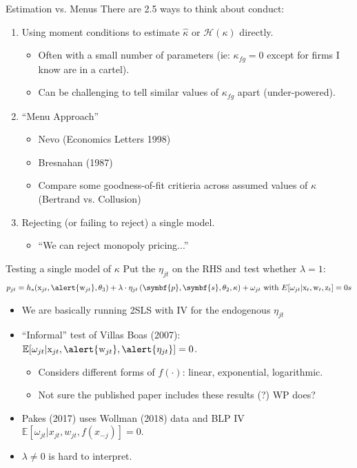 \documentclass[aspectratio=169,10pt]{beamer}
\begin{document}
\begin{frame}{Estimation vs. Menus}
There are 2.5 ways to think about conduct:
\begin{enumerate}
\item Using moment conditions to estimate $\widehat{\kappa}$ or $\mathcal{H}(\kappa)$ directly.
\begin{itemize}
\item Often with a small number of parameters (ie: $\kappa_{fg}=0$ except for firms I know are in a cartel).
\item Can be challenging to tell similar values of $\kappa_{fg}$ apart (under-powered).
\end{itemize}
\item ``Menu Approach''
\begin{itemize}
\item  Nevo (Economics Letters 1998)
\item Bresnahan (1987)
\item Compare some goodness-of-fit critieria across assumed values of $\kappa$ (Bertrand vs. Collusion)
  \end{itemize}
\item Rejecting (or failing to reject) a single model.
\begin{itemize}
  \item ``We can reject monopoly pricing...''
\end{itemize}
  \end{enumerate}
\end{frame}


\begin{frame}{Testing a single model of $\kappa$}
Put the $\eta_{jt}$ on the RHS and test whether $\lambda=1$:
\begin{align*}
 p_{jt} = h_s(\textrm{x}_{jt}, \alert{\textrm{w}_{jt}},\theta_3) + \lambda \cdot \eta_{jt}\left(\symbf{p},\symbf{s},\theta_2,\kappa \right)+  \omega_{jt} \text{ with }
 E[\omega_{jt} | \textrm{x}_{t},\textrm{w}_{t},\textrm{z}_{t}]=0s
\end{align*}
\vspace{-0.25cm}
\begin{itemize}
\item We are basically running 2SLS with IV for the endogenous $\eta_{jt}$
\item ``Informal'' test of Villas Boas (2007): $\mathbb{E}[\omega_{jt} | \textrm{x}_{jt},\alert{\textrm{w}_{jt}},\alert{\eta_{jt}}]=0$.
\begin{itemize}
\item Considers different forms of $f(\cdot)$: linear, exponential, logarithmic.
\item Not sure the published paper includes these results (?) WP does?
  \end{itemize}
\item Pakes (2017) uses Wollman (2018) data and BLP IV $\mathbb{E}[\omega_{jt} | x_{jt},w_{jt},f(x_{-j})]=0$.
\item $\lambda \neq 0$ is hard to interpret.
\end{itemize}
\end{frame}
\end{document}
